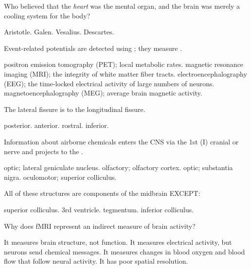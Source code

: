 \documentclass[]{exam}
\begin{document}
\begin{questions}
\question Who believed that the \emph{heart} was the mental organ, and the brain was merely a cooling system for the body?
\begin{choices}
\correctchoice Aristotle.
\choice Galen.
\choice Vesalius.
\choice Descartes.
\end{choices}

\newpage

\question Event-related potentials are detected using \fillin; they measure \fillin.
\begin{choices}
\choice positron emission tomography (PET); local metabolic rates.
\choice magnetic resonance imaging (MRI); the integrity of white matter fiber tracts.
\correctchoice electroencephalography (EEG); the time-locked electrical activity of large numbers of neurons.
\choice magnetoencephalography (MEG); average brain magnetic activity.
\end{choices}

\question The lateral fissure is \fillin to the longitudinal fissure.
\begin{choices}
\choice posterior.
\choice anterior.
\choice rostral.
\correctchoice inferior.
\end{choices}

\question Information about airborne chemicals enters the CNS via the 1st (I) cranial or \fillin nerve and projects to the \fillin.
\begin{choices}
\choice optic; lateral geniculate nucleus.
\correctchoice olfactory; olfactory cortex.
\choice optic; substantia nigra.
\choice oculomotor; superior colliculus.
\end{choices}


\question All of these structures are components of the midbrain EXCEPT:
\begin{choices}
\choice superior colliculus.
\correctchoice 3rd ventricle.
\choice tegmentum.
\choice inferior colliculus.
\end{choices}

\question Why does fMRI represent an indirect measure of brain activity?
\begin{choices}
\choice It measures brain structure, not function.
\choice It measures electrical activity, but neurons send chemical messages.
\correctchoice It measures changes in blood oxygen and blood flow that follow neural activity.
\choice It has poor spatial resolution.
\end{choices}


\end{questions}
\end{document}
